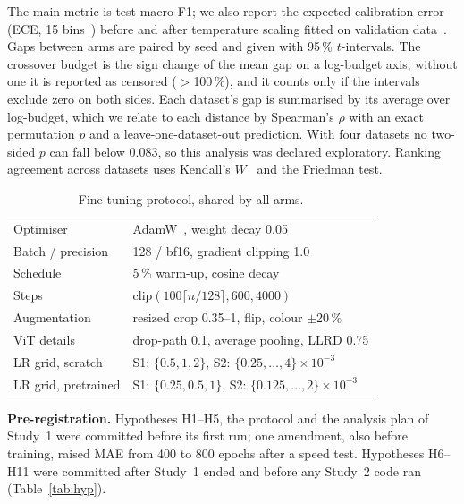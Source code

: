 \documentclass[conference]{IEEEtran}
\begin{document}
The main metric is test macro-F1; we also report the expected calibration error (ECE, 15
bins~\cite{naeini2015ece}) before and after temperature scaling fitted on validation data~\cite{guo2017calibration}.
Gaps between arms are paired by seed and given with 95\,\% $t$-intervals. The crossover budget is the sign change
of the mean gap on a log-budget axis; without one it is reported as censored ($>$100\,\%), and it counts only if
the intervals exclude zero on both sides. Each dataset's gap is summarised by its average over log-budget, which we
relate to each distance by Spearman's $\rho$ with an exact permutation $p$ and a leave-one-dataset-out prediction.
With four datasets no two-sided $p$ can fall below 0.083, so this analysis was declared exploratory. Ranking
agreement across datasets uses Kendall's $W$~\cite{kendall1939rankings} and the Friedman test.

\begin{table}[t]
\centering
\caption{Fine-tuning protocol, shared by all arms.}
\label{tab:setup}
\footnotesize
\begin{tabular}{@{}ll@{}}
\toprule
Optimiser & AdamW~\cite{loshchilov2019adamw}, weight decay 0.05 \\
Batch / precision & 128 / bf16, gradient clipping 1.0 \\
Schedule & 5\,\% warm-up, cosine decay \\
Steps & $\mathrm{clip}(100\lceil n/128\rceil, 600, 4000)$ \\
Augmentation & resized crop 0.35--1, flip, colour $\pm$20\,\% \\
ViT details & drop-path 0.1, average pooling, LLRD 0.75 \\
LR grid, scratch & S1: $\{0.5, 1, 2\}$, S2: $\{0.25, \ldots, 4\}\times10^{-3}$ \\
LR grid, pretrained & S1: $\{0.25, 0.5, 1\}$, S2: $\{0.125, \ldots, 2\}\times10^{-3}$ \\
\bottomrule
\end{tabular}
\end{table}

\textbf{Pre-registration.} Hypotheses H1--H5, the protocol and the analysis plan of Study~1 were committed before
its first run; one amendment, also before training, raised MAE from 400 to 800 epochs after a speed test.
Hypotheses H6--H11 were committed after Study~1 ended and before any Study~2 code ran (Table~\ref{tab:hyp}).

\end{document}
